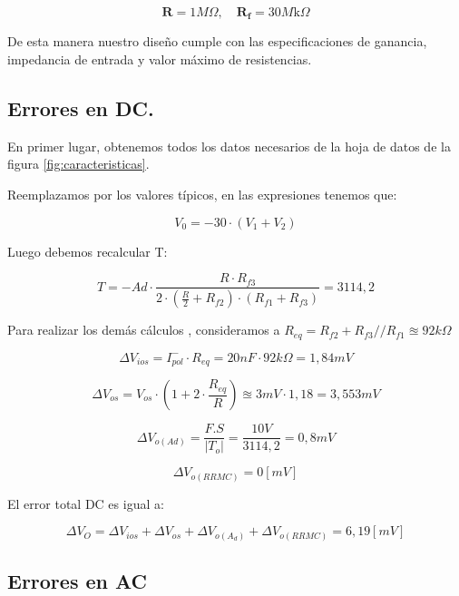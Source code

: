 \[  \mathbf{R}=1M \Omega, \quad \mathbf{R}_{\mathbf{f}}=30M \mathrm{k} \Omega \]


De esta manera nuestro diseño cumple con las especificaciones de ganancia, impedancia de entrada y valor máximo de resistencias.

\vspace{1em}

\subsection{Errores en DC.}
En primer lugar, obtenemos todos los datos necesarios de la hoja de datos de la figura \ref{fig:caracteristicas}.

\vspace{1em}

Reemplazamos por los valores típicos, en las expresiones tenemos que:


\[V_{0} = -30 \cdot (V_1 + V_2) \]

Luego debemos recalcular T:

\[T = - Ad   \cdot  \frac{R \cdot R_{f3}}{ 2 \cdot (\frac{R}{2} + R_{f2})\cdot (R_{f1}+R_{f3})} = 3114,2 \]


\vspace{1em}

Para realizar los demás cálculos , consideramos a $R_{eq} = R_{f2} + R_{f3}//R_{f1} \approxeq 92k \Omega$
 
\[ \Delta V_{ios} = I_{pol}^{-} \cdot R_{eq} = 20 nF \cdot 92 k\Omega = 1,84 mV \]

\vspace{1em} 

\[ \Delta V_{os}  = V_{os} \cdot (1 + 2 \cdot \frac {R_{eq}}{R})  \approxeq
3mV \cdot 1,18 = 3,553 mV \]

\vspace{1em}

\[ \Delta V_{o (Ad)}=\frac{F.S}{\left|T_{o}\right|} = \frac{10V}{3114,2} = 0,8 mV\]

\vspace{1em}

\[ \Delta V_{o (RRMC) } = 0 [ mV ]\]

El error total DC es igual a:

\[ \Delta V_{O} = \Delta V_{ios} + \Delta V_{os} +  \Delta V_{o (A_d)} + \Delta V_{o (RRMC) } = 6,19 [mV]\]


\subsection{Errores en AC}
 
